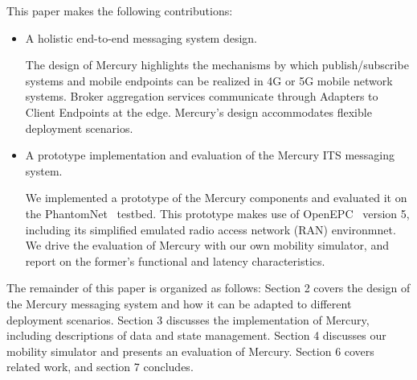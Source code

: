 This paper makes the following contributions:
\begin{itemize}

\item A holistic end-to-end messaging system design.

The design of Mercury highlights the mechanisms by which
publish/subscribe systems and mobile endpoints can be realized in 4G
or 5G mobile network systems. Broker aggregation services communicate
through Adapters to Client Endpoints at the edge. Mercury's design
accommodates flexible deployment scenarios.

\item A prototype implementation and evaluation of the Mercury ITS
  messaging system.

We implemented a prototype of the Mercury components and evaluated it
on the PhantomNet~\cite{banerjee2015phantomnet} testbed.  This
prototype makes use of OpenEPC~\cite{corici2010openepc} version 5,
including its simplified emulated radio access network (RAN)
environmnet. We drive the evaluation of Mercury with our own mobility
simulator, and report on the former's functional and latency
characteristics.

\end{itemize}

The remainder of this paper is organized as follows: Section 2 covers
the design of the Mercury messaging system and how it can be adapted
to different deployment scenarios.  Section 3 discusses the
implementation of Mercury, including descriptions of data and state
management. Section 4 discusses our mobility simulator and presents an
evaluation of Mercury.  Section 6 covers related work, and section 7
concludes.
